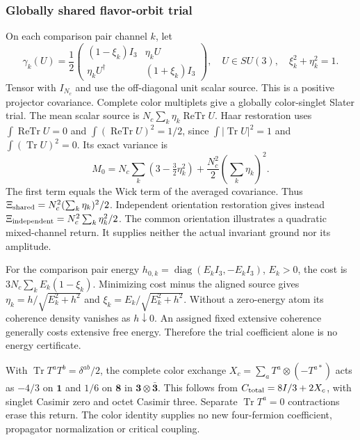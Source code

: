 \documentclass[12pt,a4paper]{article}
\begin{document}
\subsubsection{Globally shared flavor-orbit trial}
\label{p10:app:shared-flavor-chiral-trial}
On each comparison pair channel $k$, let
\[
 \gamma_k(U)=\frac12
 \begin{pmatrix}(1-\xi_k)I_3&\eta_kU\\
                 \eta_kU^\dagger&(1+\xi_k)I_3\end{pmatrix},
 \quad U\in SU(3),\quad \xi_k^2+\eta_k^2=1.
\]
Tensor with $I_{N_c}$ and use the off-diagonal unit scalar source.
This is a positive projector covariance. Complete color multiplets give
a globally color-singlet Slater trial. The mean scalar source is
$N_c\sum_k\eta_k\operatorname{ReTr}U$.
Haar restoration uses
$\int\operatorname{ReTr}U=0$ and
$\int(\operatorname{ReTr}U)^2=1/2$, since
$\int|\operatorname{Tr}U|^2=1$ and $\int(\operatorname{Tr}U)^2=0$.
Its exact variance is
\[
 M_0=N_c\sum_k(3-\tfrac32\eta_k^2)
             +\frac{N_c^2}{2}\left(\sum_k\eta_k\right)^2.
\]
The first term equals the Wick term of the averaged covariance.
Thus $\Xi_{\rm shared}=N_c^2(\sum_k\eta_k)^2/2$.
Independent orientation restoration gives instead
$\Xi_{\rm independent}=N_c^2\sum_k\eta_k^2/2$.
The common orientation illustrates a quadratic mixed-channel return.
It supplies neither the actual invariant ground nor its amplitude.

For the comparison pair energy
$h_{0,k}=\operatorname{diag}(E_kI_3,-E_kI_3)$, $E_k>0$,
the cost is $3N_c\sum_kE_k(1-\xi_k)$.
Minimizing cost minus the aligned source gives
$\eta_k=h/\sqrt{E_k^2+h^2}$ and
$\xi_k=E_k/\sqrt{E_k^2+h^2}$.
Without a zero-energy atom its coherence density vanishes as $h\downarrow0$.
An assigned fixed extensive coherence generally costs extensive free
energy. Therefore the trial coefficient alone is no energy certificate.

With $\operatorname{Tr}T^aT^b=\delta^{ab}/2$, the complete
color exchange $X_c=\sum_aT^a\otimes(-T^{a*})$ acts as
$-4/3$ on $\mathbf1$ and $1/6$ on $\mathbf8$ in
$\mathbf3\otimes\bar{\mathbf3}$. This follows from
$C_{\rm total}=8I/3+2X_c$, with singlet Casimir zero and octet Casimir
three. Separate $\operatorname{Tr}T^a=0$ contractions erase this
return. The color identity supplies no new four-fermion coefficient,
propagator normalization or critical coupling.


\end{document}
